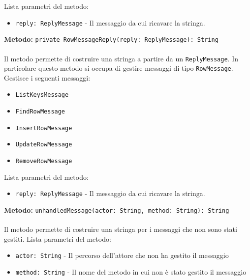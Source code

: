 \documentclass[a4paper]{article}
\begin{document}
			Lista parametri del metodo:
			\begin{itemize}
				\item \texttt{reply: ReplyMessage} - Il messaggio da cui ricavare la stringa.
			\end{itemize}
		\textbf{Metodo: }\texttt{private RowMessageReply(reply: ReplyMessage): String}
			\\ \\
			Il metodo permette di costruire una stringa a partire da un \texttt{ReplyMessage}. In particolare questo metodo si occupa di gestire messaggi di tipo \texttt{RowMessage}.
			Gestisce i seguenti messaggi:
			\begin{itemize}
				\item \texttt{ListKeysMessage}
				\item \texttt{FindRowMessage}
				\item \texttt{InsertRowMessage}
				\item \texttt{UpdateRowMessage}
				\item \texttt{RemoveRowMessage}
			\end{itemize}
			Lista parametri del metodo:
			\begin{itemize}
				\item \texttt{reply: ReplyMessage} - Il messaggio da cui ricavare la stringa.
			\end{itemize}
		\textbf{Metodo: }\texttt{unhandledMessage(actor: String, method: String): String}
			\\ \\
			Il metodo permette di costruire una stringa per i messaggi che non sono stati gestiti.
			Lista parametri del metodo:
			\begin{itemize}
				\item \texttt{actor: String} - Il percorso dell'attore che non ha gestito il messaggio
				\item \texttt{method: String} - Il nome del metodo in cui non è stato gestito il messaggio
			\end{itemize}
			
\end{document}
